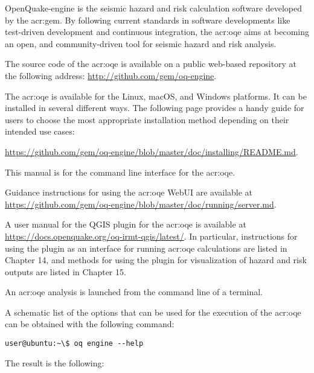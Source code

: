 OpenQuake-engine is the seismic hazard and risk calculation software developed by
the \glsdesc{acr:gem}. By following current standards in software
developments like test-driven development and continuous integration, the
\glsdesc{acr:oqe} aims at becoming an open, and community-driven tool for
seismic hazard and risk analysis.

The source code of the \glsdesc{acr:oqe} is available on a public web-based
repository at the following address:
\href{http://github.com/gem/oq-engine}{http://github.com/gem/oq-engine}.

The \glsdesc{acr:oqe} is available for the Linux, macOS, and Windows
platforms. It can be installed in several different ways. The following page
provides a handy guide for users to choose the most appropriate installation
method depending on their intended use cases:

\href{https://github.com/gem/oq-engine/blob/master/doc/installing/README.md}{https://github.com/gem/oq-engine/blob/master/doc/installing/README.md}.

This manual is for the command line interface for the \glsdesc{acr:oqe}. 

Guidance instructions for using the \glsdesc{acr:oqe} WebUI are available 
at \href{https://github.com/gem/oq-engine/blob/master/doc/running/server.md}{https://github.com/gem/oq-engine/blob/master/doc/running/server.md}.

A user manual for the QGIS plugin for the \glsdesc{acr:oqe} is available at 
\href{https://docs.openquake.org/oq-irmt-qgis/latest/}{https://docs.openquake.org/oq-irmt-qgis/latest/}. 
In particular, instructions for using the plugin as an interface for running \glsdesc{acr:oqe}
calculations are listed in Chapter 14, and methods for using the plugin for visualization 
of hazard and risk outputs are listed in Chapter 15.

An \gls{acr:oqe} analysis is launched from the command line of a terminal.

A schematic list of the options that can be used for the execution of the
\gls{acr:oqe} can be obtained with the following command:

\begin{verbatim}
user@ubuntu:~\$ oq engine --help
\end{verbatim}

The result is the following:
\inputminted[firstline=1,fontsize=\footnotesize,frame=single]{shell-session}{oqum/help.txt}
